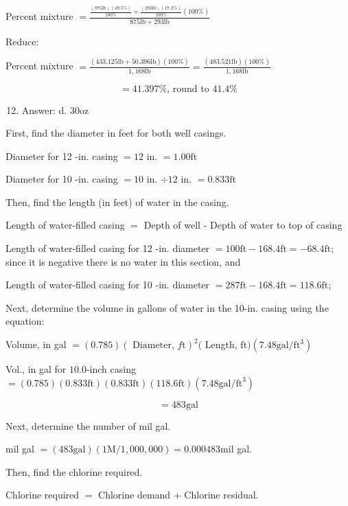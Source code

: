 \documentclass[10pt]{article}
\begin{document}
Percent mixture $=\frac{\frac{(875 \mathrm{lb})(49.5 \%)}{100 \%}+\frac{(293 \mathrm{lb})(17.2 \%)}{100 \%}(100 \%)}{875 \mathrm{lb}+293 \mathrm{lb}}$

Reduce:

Percent mixture $=\frac{(433.125 \mathrm{lb}+50.396 \mathrm{lb})(100 \%)}{1,168 \mathrm{lb}}=\frac{(483.521 \mathrm{lb})(100 \%)}{1,168 \mathrm{lb}}$

$$
=41.397 \% \text {, round to } 41.4 \%
$$

\begin{enumerate}
  \setcounter{enumi}{11}
  \item Answer: d. $30 \mathrm{oz}$
\end{enumerate}

First, find the diameter in feet for both well casings.

Diameter for 12 -in. casing $=12$ in. $=1.00 \mathrm{ft}$

Diameter for 10 -in. casing $=10$ in. $\div 12$ in. $=0.833 \mathrm{ft}$

Then, find the length (in feet) of water in the casing.

Length of water-filled casing $=$ Depth of well - Depth of water to top of casing

Length of water-filled casing for 12 -in. diameter $=100 \mathrm{ft}-168.4 \mathrm{ft}=-68.4 \mathrm{ft}$; since it is negative there is no water in this section, and

Length of water-filled casing for 10 -in. diameter $=287 \mathrm{ft}-168.4 \mathrm{ft}=118.6 \mathrm{ft}$;

Next, determine the volume in gallons of water in the 10-in. casing using the equation:

Volume, in gal $=(0.785)(\text { Diameter, } f \mathrm{t})^{2}($ Length, $\mathrm{ft})\left(7.48 \mathrm{gal} / \mathrm{ft}^{3}\right)$

Vol., in gal for $10.0$-inch casing $=(0.785)(0.833 \mathrm{ft})(0.833 \mathrm{ft})(118.6 \mathrm{ft})\left(7.48 \mathrm{gal} / \mathrm{ft}^{3}\right)$

$$
=483 \mathrm{gal}
$$

Next, determine the number of mil gal.

mil gal $=(483 \mathrm{gal})(1 \mathrm{M} / 1,000,000)=0.000483 \mathrm{mil}$ gal.

Then, find the chlorine required.

Chlorine required $=$ Chlorine demand $+$ Chlorine residual.
\end{document}

